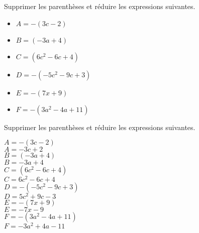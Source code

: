 \begin{exercice*}
    Supprimer les parenthèses et réduire les expressions suivantes.
    \begin{multicols}{2}
        \begin{itemize}
            \item[] $A=-(3c-2)$
            \item[] $B=(-3a+4)$
            \item[] $C=(6c^2-6c+4)$
            \item[] $D=-(-5c^2-9c+3)$
            \item[] $E=-(7x+9)$
            \item[] $F=-(3a^2-4a+11)$
        \end{itemize}
    \end{multicols}
\end{exercice*}
\begin{corrige}
    Supprimer les parenthèses et réduire les expressions suivantes.
    \begin{multicols}{2}
        \begin{itemize}
            \def\item{}
            \item $A=-(3c-2)$\\
            {\red $A=-3c+2$\\\smallskip}
            \item $B=(-3a+4)$\\
            {\red $B=-3a+4$\\\smallskip}
            \item $C=(6c^2-6c+4)$\\
            {\red $C=6c^2-6c+4$\\\smallskip}
            \item $D=-(-5c^2-9c+3)$\\
            {\red $D=5c^2+9c-3$\\\smallskip}
            \item $E=-(7x+9)$\\
            {\red $E=-7x-9$\\\smallskip}
            \item $F=-(3a^2-4a+11)$\\
            {\red $F=-3a^2+4a-11$}
        \end{itemize}
    \end{multicols}
\end{corrige}

